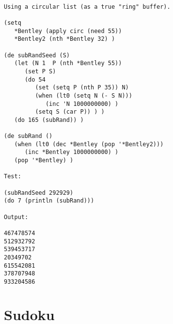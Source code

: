 \begin{verbatim}

Using a circular list (as a true "ring" buffer).

(setq
   *Bentley (apply circ (need 55))
   *Bentley2 (nth *Bentley 32) )

(de subRandSeed (S)
   (let (N 1  P (nth *Bentley 55))
      (set P S)
      (do 54
         (set (setq P (nth P 35)) N)
         (when (lt0 (setq N (- S N)))
            (inc 'N 1000000000) )
         (setq S (car P)) ) )
   (do 165 (subRand)) )

(de subRand ()
   (when (lt0 (dec *Bentley (pop '*Bentley2)))
      (inc *Bentley 1000000000) )
   (pop '*Bentley) )

Test:

(subRandSeed 292929)
(do 7 (println (subRand)))

Output:

467478574
512932792
539453717
20349702
615542081
378707948
933204586

\end{verbatim}

\section*{Sudoku}

